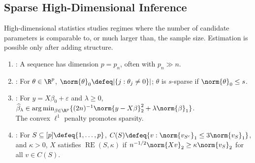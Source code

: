 \subsection{Sparse High-Dimensional Inference}

High-dimensional statistics studies regimes where the number of candidate parameters is comparable to, or much larger than, the sample size.  Estimation is possible only after adding structure.

\begin{definition} \label{def:sparse-vector-and-high-dimensional-regime} \label{def:lasso-estimator} \label{def:restricted-eigenvalue-condition} 
\begin{enumerate}[label=(\roman*)]
\setlength{\itemsep}{0pt}
\item {}: A sequence has dimension $p=p_n$, often with $p_n\gg n$.
\item {}: For $\theta\in\R^p$, $\norm{\theta}_0\defeq|\{j:\theta_j\neq0\}|$; $\theta$ is $s$-sparse if $\norm{\theta}_0\leq s$.
\item {}: For $y=X\beta_0+\varepsilon$ and $\lambda\geq0$, $\widehat{\beta}_\lambda\in\operatorname*{arg\,min}_{\beta\in\R^p}\{(2n)^{-1}\norm{y-X\beta}_2^2+\lambda\norm{\beta}_1\}$.\\
The convex $\ell^1$ penalty promotes sparsity.
\item {}: For $S\subseteq[p]\defeq\{1,\ldots,p\}$, $C(S)\defeq\{v:\norm{v_{S^c}}_1\leq3\norm{v_S}_1\}$,\\
and $\kappa>0$, $X$ satisfies $\operatorname{RE}(S,\kappa)$ if $n^{-1/2}\norm{Xv}_2\geq\kappa\norm{v_S}_2$ for all $v\in C(S)$.
\end{enumerate}
\end{definition}


